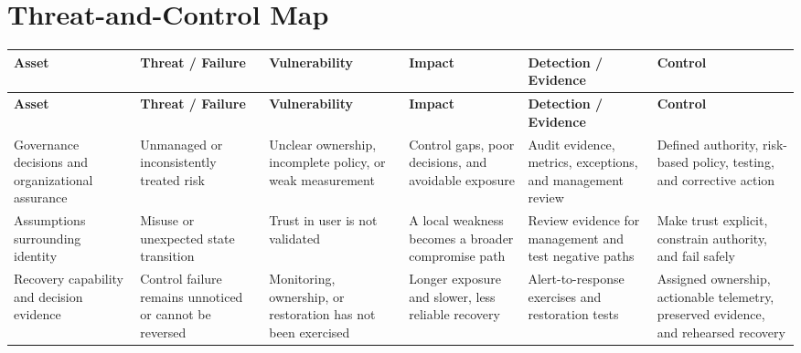 \documentclass[11pt,letterpaper]{article}
\begin{document}
\section*{Threat-and-Control Map}
\begingroup\scriptsize\setlength{\tabcolsep}{2pt}
\begin{longtable}{>{\raggedright\arraybackslash}p{}>{\raggedright\arraybackslash}p{}>{\raggedright\arraybackslash}p{}>{\raggedright\arraybackslash}p{}>{\raggedright\arraybackslash}p{}>{\raggedright\arraybackslash}p{}}
\toprule\rowcolor{Navy}\color{white}\textbf{Asset} & \color{white}\textbf{Threat / Failure} & \color{white}\textbf{Vulnerability} & \color{white}\textbf{Impact} & \color{white}\textbf{Detection / Evidence} & \color{white}\textbf{Control}\\\midrule
\endfirsthead
\toprule\rowcolor{Navy}\color{white}\textbf{Asset} & \color{white}\textbf{Threat / Failure} & \color{white}\textbf{Vulnerability} & \color{white}\textbf{Impact} & \color{white}\textbf{Detection / Evidence} & \color{white}\textbf{Control}\\\midrule
\endhead
Governance decisions and organizational assurance & Unmanaged or inconsistently treated risk & Unclear ownership, incomplete policy, or weak measurement & Control gaps, poor decisions, and avoidable exposure & Audit evidence, metrics, exceptions, and management review & Defined authority, risk-based policy, testing, and corrective action\\\midrule
Assumptions surrounding identity & Misuse or unexpected state transition & Trust in user is not validated & A local weakness becomes a broader compromise path & Review evidence for management and test negative paths & Make trust explicit, constrain authority, and fail safely\\\midrule
Recovery capability and decision evidence & Control failure remains unnoticed or cannot be reversed & Monitoring, ownership, or restoration has not been exercised & Longer exposure and slower, less reliable recovery & Alert-to-response exercises and restoration tests & Assigned ownership, actionable telemetry, preserved evidence, and rehearsed recovery\\\midrule
\bottomrule
\end{longtable}
\endgroup
\end{document}

